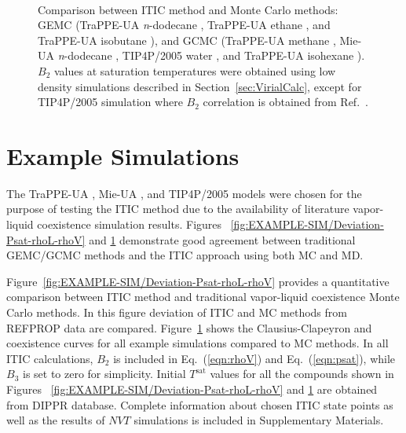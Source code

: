 \documentclass[5p,times]{elsarticle}
\begin{document}
\begin{figure}[]
\centering
{}\label{aa}
\label{bb}\\
\label{cc}
\label{dd}
\caption{
Comparison between ITIC method and Monte Carlo methods: GEMC (TraPPE-UA \textit{n}-dodecane \cite{Martin1998}, TraPPE-UA ethane \cite{Martin1998}, and TraPPE-UA isobutane \cite{Wick2000}), and GCMC (TraPPE-UA methane \cite{Shen2008}, Mie-UA \textit{n}-dodecane \cite{Potoff2009}, TIP4P/2005 water \cite{Shen2008}, and TraPPE-UA isohexane \cite{Mick2017}). $B_2$ values at saturation temperatures were obtained using low density simulations described in Section~\ref{sec:VirialCalc}, except for TIP4P/2005 simulation where $B_2$ correlation is obtained from Ref.~\cite{Benjamin2007,Chialvo2006}.
}
\label{fig:EXAMPLE-SIM/all}
\end{figure}

\section{Example Simulations} \label{sec:ExampleSim}
The TraPPE-UA \cite{Martin1998,Martin1999,Wick2000}, Mie-UA \cite{Potoff2009,Mick2017,Barhaghi2017,Mick2015}, and TIP4P/2005 \cite{Abascal2005} models were chosen for the purpose of testing the ITIC method due to the availability of literature vapor-liquid coexistence simulation results. Figures ~\ref{fig:EXAMPLE-SIM/Deviation-Psat-rhoL-rhoV} and \ref{fig:EXAMPLE-SIM/all} demonstrate good agreement between traditional GEMC/GCMC methods and the ITIC approach using both MC and MD.

Figure~\ref{fig:EXAMPLE-SIM/Deviation-Psat-rhoL-rhoV} provides a quantitative comparison between ITIC method and traditional vapor-liquid coexistence Monte Carlo methods. In this figure deviation of ITIC and MC methods from REFPROP data are compared. Figure~\ref{fig:EXAMPLE-SIM/all} shows the Clausius-Clapeyron and coexistence curves for all example simulations compared to MC methods. In all ITIC calculations, $B_2$ is included in Eq.~(\ref{eqn:rhoV}) and Eq.~(\ref{eqn:psat}), while $B_3$ is set to zero for simplicity. Initial $T^\mathrm{sat}$ values for all the compounds shown in Figures ~\ref{fig:EXAMPLE-SIM/Deviation-Psat-rhoL-rhoV} and \ref{fig:EXAMPLE-SIM/all} are obtained from DIPPR \cite{DIPPR2004} database. Complete information about chosen ITIC state points as well as the results of $NVT$ simulations is included in Supplementary Materials.
\end{document}
